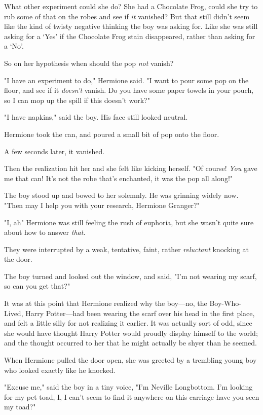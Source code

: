 What other experiment could she do? She had a Chocolate Frog, could she try to
rub some of that on the robes and see if \emph{it} vanished? But that still
didn't seem like the kind of twisty negative thinking the boy was asking for.
Like she was still asking for a `Yes' if the Chocolate Frog stain disappeared,
rather than asking for a `No'.

So{\el} on her hypothesis{\el} when should the pop{\el} \emph{not}
vanish?

"I have an experiment to do," Hermione said. "I want to pour some pop on the
floor, and see if it \emph{doesn't} vanish. Do you have some paper towels in
your pouch, so I can mop up the spill if this doesn't work?"

"I have napkins," said the boy. His face still looked neutral.

Hermione took the can, and poured a small bit of pop onto the floor.

A few seconds later, it vanished.

Then the realization hit her and she felt like kicking herself. "Of course!
\emph{You} gave me that can! It's not the robe that's enchanted, it was the pop
all along!"

The boy stood up and bowed to her solemnly. He was grinning widely now.
"Then{\el} may I help you with your research, Hermione Granger?"

"I, ah{\el}" Hermione was still feeling the rush of euphoria, but she wasn't
quite sure about how to answer \emph{that.}

They were interrupted by a weak, tentative, faint, rather \emph{reluctant}
knocking at the door.

The boy turned and looked out the window, and said, "I'm not wearing my scarf,
so can you get that?"

It was at this point that Hermione realized why the boy—no, the
Boy-Who-Lived, Harry Potter—had been wearing the scarf over his head in the
first place, and felt a little silly for not realizing it earlier. It was
actually sort of odd, since she would have thought Harry Potter would proudly
display himself to the world; and the thought occurred to her that he might
actually be shyer than he seemed.

When Hermione pulled the door open, she was greeted by a trembling young boy
who looked exactly like he knocked.

"Excuse me," said the boy in a tiny voice, "I'm Neville Longbottom. I'm looking
for my pet toad, I, I can't seem to find it anywhere on this carriage{\el}
have you seen my toad?"

